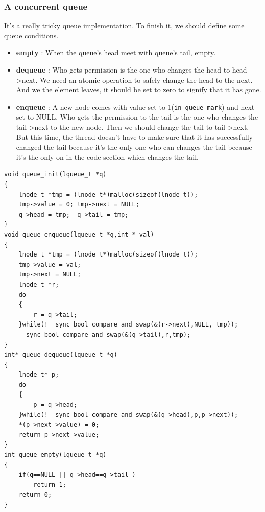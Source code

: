 \documentclass{article}
\begin{document}
	 \subsubsection{A concurrent queue}
	 It's a really tricky queue implementation. To finish it, we should define some queue conditions.\\
	 \begin{itemize}
	 	\item \textbf{empty} : When the queue's head meet with queue's tail, empty. \\
	 	\item \textbf{dequeue} : Who gets permission is the one who changes the head to head->next. We need an atomic operation to safely change the head to the next. And we the element leaves, it should be set to zero to signify that it has gone.\\
	 	\item \textbf{enqueue} : A new node comes with value set to 1(\texttt{in queue mark}) and next set to NULL. Who gets the permission to the tail is the one who changes the tail->next to the new node. Then we should change the tail to tail->next. But this time, the thread doesn't have to make sure that it has successfully changed the tail because  it's the only one who can changes the tail because it's the only on in the code section which changes the tail.
	 \end{itemize}
 	\begin{lstlisting}
void queue_init(lqueue_t *q)
{
	lnode_t *tmp = (lnode_t*)malloc(sizeof(lnode_t));
	tmp->value = 0; tmp->next = NULL;
	q->head = tmp;  q->tail = tmp;
}
void queue_enqueue(lqueue_t *q,int * val)
{
	lnode_t *tmp = (lnode_t*)malloc(sizeof(lnode_t));
	tmp->value = val;
	tmp->next = NULL;
	lnode_t *r;
	do
	{
		r = q->tail;
	}while(!__sync_bool_compare_and_swap(&(r->next),NULL, tmp));
	__sync_bool_compare_and_swap(&(q->tail),r,tmp);
}
int* queue_dequeue(lqueue_t *q)
{
	lnode_t* p;
	do
	{
		p = q->head;
	}while(!__sync_bool_compare_and_swap(&(q->head),p,p->next));
	*(p->next->value) = 0;
	return p->next->value;
}
int queue_empty(lqueue_t *q)
{
	if(q==NULL || q->head==q->tail )
		return 1;
	return 0;
}
 	\end{lstlisting}
\end{document}
